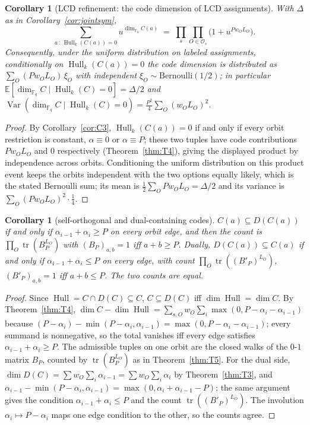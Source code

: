\documentclass[10pt,journal,draftclsnofoot,onecolumn]{IEEEtran}
\newtheorem{corollary}[theorem]{Corollary}
\theoremstyle{definition}
\theoremstyle{remark}
\newcommand{\Fq}{\mathbb{F}_q}
\newcommand{\Hull}{\operatorname{Hull}}
\newcommand{\tr}{\operatorname{tr}}
\newcommand{\E}{\mathbb{E}}
\begin{document}
\begin{corollary}[LCD refinement: the code dimension of LCD assignments]
\label{cor:LCDref}
With \(\Delta\) as in Corollary~\ref{cor:jointsym},
\[
\sum_{a \,:\, \Hull_k(C(a)) = 0} u^{\dim_{\Fq} C(a)}
\;=\; \prod_{s} \prod_{O \in \mathcal{O}_s} \big(1 + u^{P w_O L_O}\big).
\]
Consequently, under the uniform distribution on labeled assignments,
conditionally on \(\Hull_k(C(a)) = 0\) the code dimension is distributed
as \(\sum_O (P w_O L_O)\, \xi_O\) with independent
\(\xi_O \sim \mathrm{Bernoulli}(1/2)\); in particular
\(\E[\dim_{\Fq} C \mid \Hull_k(C) = 0] = \Delta/2\) and
\(\operatorname{Var}(\dim_{\Fq} C \mid \Hull_k(C) = 0)
= \frac{P^2}{4} \sum_O (w_O L_O)^2\).
\end{corollary}

\begin{proof}
By Corollary~\ref{cor:C3}, \(\Hull_k(C(a)) = 0\) if and only if every
orbit restriction is constant, \(\alpha \equiv 0\) or \(\alpha \equiv
P\); these two tuples have code contributions \(Pw_OL_O\) and \(0\)
respectively (Theorem~\ref{thm:T4}), giving the displayed product by
independence across orbits. Conditioning the uniform distribution on
this product event keeps the orbits independent with the two options
equally likely, which is the stated Bernoulli sum; its mean is
\(\tfrac12 \sum_O Pw_OL_O = \Delta/2\) and its variance is
\(\sum_O (Pw_OL_O)^2 \cdot \tfrac14\).
\end{proof}

\begin{corollary}[self-orthogonal and dual-containing codes]
\label{cor:C4}
\(C(a) \subseteq D(C(a))\) if and only if
\(\alpha_{i-1} + \alpha_i \ge P\) on every orbit edge, and then the count
is \(\prod_O \tr(B_P^{L_O})\) with \((B_P)_{a,b} = 1\) iff \(a+b \ge P\).
Dually, \(D(C(a)) \subseteq C(a)\) if and only if
\(\alpha_{i-1} + \alpha_i \le P\) on every edge, with count
\(\prod_O \tr((B'_P)^{L_O})\), \((B'_P)_{a,b} = 1\) iff \(a+b \le P\).
The two counts are equal.
\end{corollary}

\begin{proof}
Since \(\Hull = C \cap D(C) \subseteq C\), \(C \subseteq D(C)\) iff
\(\dim \Hull = \dim C\). By Theorem~\ref{thm:T4},
\(\dim C - \dim \Hull = \sum_{s,O} w_O \sum_i \max(0, P-\alpha_i-\alpha_{i-1})\)
because \((P-\alpha_i) - \min(P-\alpha_i,\alpha_{i-1}) =
\max(0, P-\alpha_i-\alpha_{i-1})\); every summand is nonnegative, so the
total vanishes iff every edge satisfies \(\alpha_{i-1}+\alpha_i \ge P\).
The admissible tuples on one orbit are the closed walks of the \(0\)-\(1\)
matrix \(B_P\), counted by \(\tr(B_P^{L_O})\) as in
Theorem~\ref{thm:T5}. For the dual side, \(\dim D(C) =
\sum w_O \sum_i \alpha_{i-1} = \sum w_O \sum_i \alpha_i\) by
Theorem~\ref{thm:T3}, and \(\alpha_{i-1} - \min(P-\alpha_i,\alpha_{i-1})
= \max(0, \alpha_i+\alpha_{i-1}-P)\); the same argument gives the
condition \(\alpha_{i-1}+\alpha_i \le P\) and the count
\(\tr((B'_P)^{L_O})\). The involution \(\alpha_i \mapsto P-\alpha_i\)
maps one edge condition to the other, so the counts agree.
\end{proof}
\end{document}
